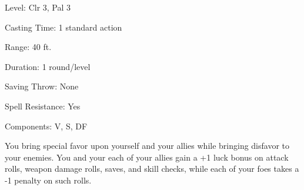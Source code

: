
\begin{description*}
\item[Level:] Clr 3, Pal 3
\item[Casting Time:] 1 standard action
\item[Range:] 40 ft.
\item[Duration:] 1 round/level
\item[Saving Throw:] None
\item[Spell Resistance:] Yes
\item[Components:] V, S, DF
\end{description*}

You bring special favor upon yourself and your allies while bringing disfavor to
your enemies. You and your each of your allies gain a +1 luck bonus on attack rolls,
weapon damage rolls, saves, and skill checks, while each of your foes takes a -1
penalty on such rolls.